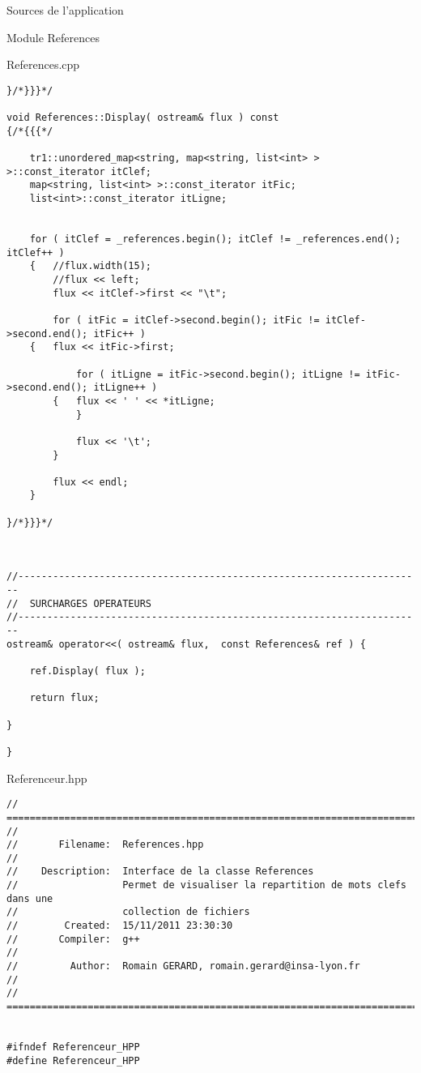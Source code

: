 \documentclass{article}
\begin{document}
\begin{section}{Sources de l'application}
\begin{subsection}{Module References}
\begin{paragraph}{References.cpp}
\begin{verbatim}
}/*}}}*/

void References::Display( ostream& flux ) const
{/*{{{*/

    tr1::unordered_map<string, map<string, list<int> > >::const_iterator itClef;
    map<string, list<int> >::const_iterator itFic;
    list<int>::const_iterator itLigne;


    for ( itClef = _references.begin(); itClef != _references.end(); itClef++ )
    {	//flux.width(15);
        //flux << left;
        flux << itClef->first << "\t";

        for ( itFic = itClef->second.begin(); itFic != itClef->second.end(); itFic++ )
	{	flux << itFic->first;

            for ( itLigne = itFic->second.begin(); itLigne != itFic->second.end(); itLigne++ )
	    {	flux << ' ' << *itLigne;
            }

            flux << '\t';
        }

        flux << endl;
    }

}/*}}}*/



//----------------------------------------------------------------------
//  SURCHARGES OPERATEURS
//----------------------------------------------------------------------
ostream& operator<<( ostream& flux,  const References& ref ) {

    ref.Display( flux );

    return flux;

}

}
  \end{verbatim}

  \end{paragraph}





\newpage
  \begin{paragraph}{Referenceur.hpp}
   \begin{verbatim}
// =====================================================================================
//
//       Filename:  References.hpp
//
//    Description:  Interface de la classe References
//                  Permet de visualiser la repartition de mots clefs dans une
//                  collection de fichiers
//        Created:  15/11/2011 23:30:30
//       Compiler:  g++
//
//         Author:  Romain GERARD, romain.gerard@insa-lyon.fr
//
// =====================================================================================


#ifndef Referenceur_HPP
#define Referenceur_HPP


\end{verbatim}
\end{paragraph}
\end{subsection}
\end{section}
\end{document}
